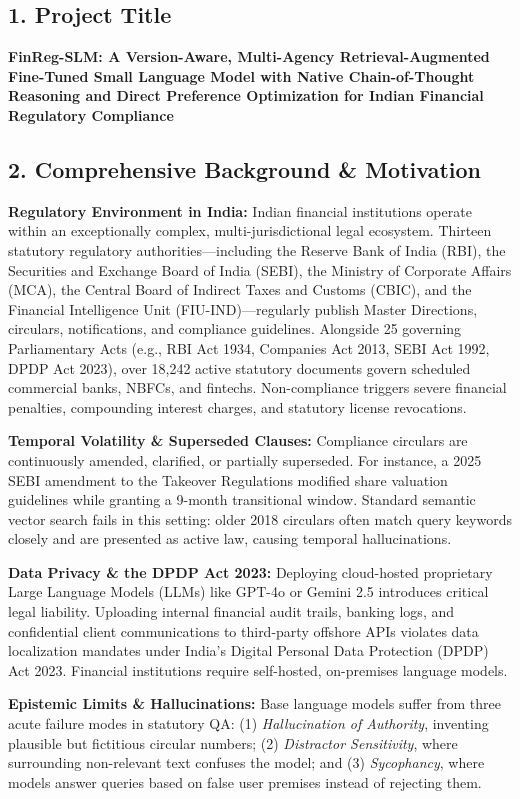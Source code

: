\documentclass[11pt,a4paper]{article}
\begin{document}
\subsection*{1. Project Title}
\textbf{FinReg-SLM: A Version-Aware, Multi-Agency Retrieval-Augmented Fine-Tuned Small Language Model with Native Chain-of-Thought Reasoning and Direct Preference Optimization for Indian Financial Regulatory Compliance}

\subsection*{2. Comprehensive Background \& Motivation}
\textbf{Regulatory Environment in India:} Indian financial institutions operate within an exceptionally complex, multi-jurisdictional legal ecosystem. Thirteen statutory regulatory authorities---including the Reserve Bank of India (RBI), the Securities and Exchange Board of India (SEBI), the Ministry of Corporate Affairs (MCA), the Central Board of Indirect Taxes and Customs (CBIC), and the Financial Intelligence Unit (FIU-IND)---regularly publish Master Directions, circulars, notifications, and compliance guidelines. Alongside 25 governing Parliamentary Acts (e.g., RBI Act 1934, Companies Act 2013, SEBI Act 1992, DPDP Act 2023), over 18,242 active statutory documents govern scheduled commercial banks, NBFCs, and fintechs. Non-compliance triggers severe financial penalties, compounding interest charges, and statutory license revocations.

\textbf{Temporal Volatility \& Superseded Clauses:} Compliance circulars are continuously amended, clarified, or partially superseded. For instance, a 2025 SEBI amendment to the Takeover Regulations modified share valuation guidelines while granting a 9-month transitional window. Standard semantic vector search fails in this setting: older 2018 circulars often match query keywords closely and are presented as active law, causing temporal hallucinations.

\textbf{Data Privacy \& the DPDP Act 2023:} Deploying cloud-hosted proprietary Large Language Models (LLMs) like GPT-4o or Gemini 2.5 introduces critical legal liability. Uploading internal financial audit trails, banking logs, and confidential client communications to third-party offshore APIs violates data localization mandates under India's Digital Personal Data Protection (DPDP) Act 2023. Financial institutions require self-hosted, on-premises language models.

\textbf{Epistemic Limits \& Hallucinations:} Base language models suffer from three acute failure modes in statutory QA: (1) \emph{Hallucination of Authority}, inventing plausible but fictitious circular numbers; (2) \emph{Distractor Sensitivity}, where surrounding non-relevant text confuses the model; and (3) \emph{Sycophancy}, where models answer queries based on false user premises instead of rejecting them.
\end{document}
